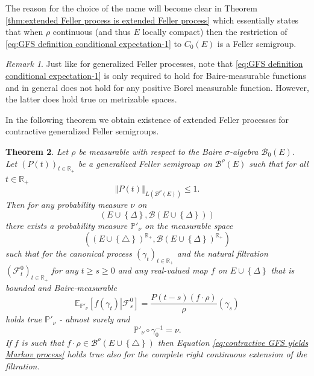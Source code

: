 \documentclass[a4paper,12pt]{article}
\newtheorem{theorem}{Theorem}[section]
\theoremstyle{definition}
\theoremstyle{remark}
\newtheorem{remark}[theorem]{Remark}
\numberwithin{equation}{section}
\numberwithin{theorem}{section}
\begin{document}
The reason for the choice of the name will become clear
in Theorem \ref{thm:extended Feller process is extended Feller process} which essentially states that when $\rho$ continuous (and thus $E$ locally compact) then the restriction of \eqref{eq:GFS definition conditional expectation-1} to $C_0(E)$ is a Feller semigroup.


\begin{remark}
Just like for generalized Feller processes, 
note that \eqref{eq:GFS definition conditional expectation-1} is only required to hold for Baire-measurable functions and  in general does not hold for any positive Borel measurable function. 
However, the latter does hold true on metrizable spaces. 
\end{remark}

In the following theorem we obtain existence of extended Feller processes for contractive generalized Feller semigroups.
\begin{theorem}
\label{thm:contractive gFs on weighted space is Markov process} Let $\rho$ be measurable with respect to the Baire $\sigma$-algebra
$\mathcal{B}_{0}(E)$. Let $\left(P(t)\right)_{t\in\mathbb{R}_{+}}$
be a generalized Feller semigroup on $\mathcal{\mathscr{B}}^{\rho}(E)$
such that for all $t\in\mathbb{R}_{+}$
\[
\left\Vert P(t)\right\Vert _{L(\mathcal{\mathscr{B}}^{\rho}(E))}\leq1.
\]
 Then for any probability measure $\nu$ on
\[
\left(E\cup\left\{ \Delta\right\} ,\mathcal{B}(E\cup\left\{ \Delta\right\} )\right)
\]
 there exists a probability measure $\mathbb{P}'_{\nu}$ on the measurable
space 
\[
\left(\left(E\cup\left\{ \triangle\right\} \right)^{\mathbb{R}_{+}},\mathcal{B}(E\cup\left\{ \Delta\right\} )^{\mathbb{R}_{+}}\right)
\]
 such that for the canonical process $\left(\gamma_{t}\right)_{t\in\mathbb{R}_{+}}$
and the natural filtration $\left(\mathcal{F}_{t}^{0}\right)_{t\in\mathbb{R}_{+}}$
for any $t\geq s\geq0$ and any real-valued map $f$ on $E\cup\left\{ \Delta\right\} $
that is bounded and Baire-measurable
\begin{equation}
\mathbb{E}_{\mathbb{P}'_{\nu}}\left[\left.f(\gamma_{t})\right|\mathcal{F}_{s}^{0}\right]=\frac{P\left(t-s\right)\left(f\cdot\rho\right)}{\rho}(\gamma_{s})\label{eq:contractive GFS yields Markov process}
\end{equation}
holds true $\mathbb{P}'_{\nu}$ - almost surely and 
\[
\mathbb{P}'_{\nu}\circ\gamma_{\text{0}}^{-1}=\nu.
\]
If $f$ is such that $f\cdot\rho\in\mathcal{\mathscr{B}}^{\rho}(E\cup\left\{ \triangle\right\} )$
then Equation \eqref{eq:contractive GFS yields Markov process} holds
true also for the complete right continuous extension of the filtration. 
\end{theorem}
\end{document}
